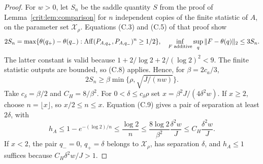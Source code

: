\begin{proof}
For $w>0$, let $S_n$ be the saddle quantity $S$ from the proof of
Lemma~\ref{crit:lem:comparison} for $n$ independent copies of the finite
statistic of $A$, on the parameter set $\mathcal X_\rho$.
Equations (C.3) and (C.5) of that proof show
\[
 2S_n=\max\{\theta(q_+)-\theta(q_-):
             \operatorname{Aff}(P_{A,q_+},P_{A,q_-})^n\ge1/2\},
 \quad \inf_{F\text{ additive}}\sup_q\|F-\theta(q)\|_2\le3S_n.
\]
The latter constant is valid because
$1+2/\log2+2/(\log2)^2<9$. The finite statistic outputs are bounded, so
(C.8) applies. Hence, for $\beta=2c_a/3$,
\[
 2S_n\ge\beta\min\{\rho,\sqrt{J/(nw)}\}.                 \tag{C.9}
\]
Take $c_\delta=\beta/2$ and $C_H=8/\beta^2$.
For $0<\delta\le c_\delta\rho$ set
$x=\beta^2J/(4\delta^2w)$. If $x\ge2$, choose $n=\lfloor x\rfloor$,
so $x/2\le n\le x$. Equation (C.9) gives a pair of separation at least
$2\delta$, with
\[
 h_A\le1-e^{-(\log2)/n}
       \le\frac{\log2}{n}
       \le\frac{8\log2}{\beta^2}\frac{\delta^2w}{J}
       \le C_H\frac{\delta^2w}{J}.
\]
If $x<2$, the pair $q_-=0$, $q_+=\delta$ belongs to
$\mathcal X_\rho$, has separation $\delta$, and $h_A\le1$ suffices
because $C_H\delta^2w/J>1$.
\end{proof}

